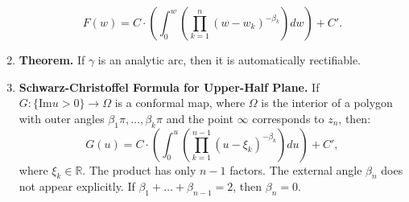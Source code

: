 \begin{enumerate}
	$$
	F(w) = C \cdot \left(\int_{0}^{w} \left(\prod_{k=1}^{n} (w-w_k)^{-\beta_k}\right) dw \right) + C'. 
	$$
	\item \textbf{Theorem. } If $\gamma$ is an analytic arc, then it is automatically rectifiable. 
	\item \textbf{Schwarz-Christoffel Formula for Upper-Half Plane. } If $G: \{\textrm{Im} u > 0\} \to \Omega$ is a conformal map, where $\Omega$ is the interior of a polygon with outer angles $\beta_1\pi,\dots,\beta_k\pi$ and the point $\infty$ corresponds to $z_n$, then: 
	$$
	G(u) = C \cdot \left(\int_{0}^{u} \left(\prod_{k=1}^{n-1} (u - \xi_k)^{-\beta_k}\right) du \right) + C', 
	$$
	where $\xi_k \in \mathbb{R}$. The product has only $n-1$ factors. The external angle $\beta_n$ does not appear explicitly. If $\beta_1 + \dots + \beta_{n-1}=2$, then $\beta_n = 0$. 
\end{enumerate}  
 

